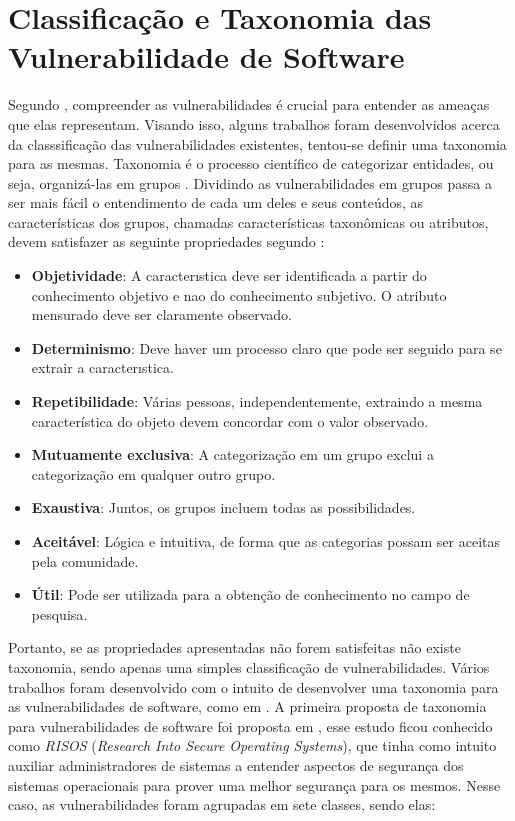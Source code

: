 \section{Classificação e Taxonomia das Vulnerabilidade de Software}\label{cwe}

Segundo , compreender as vulnerabilidades é
crucial para entender as ameaças que elas representam. Visando isso, alguns
trabalhos foram desenvolvidos acerca da classsificação das vulnerabilidades
existentes, tentou-se definir uma taxonomia para as mesmas. Taxonomia é o
processo científico de categorizar entidades, ou seja, organizá-las em grupos
\cite{gregio:2005}. Dividindo as vulnerabilidades em grupos passa a ser mais
fácil o entendimento de cada um deles e seus conteúdos, as características dos
grupos, chamadas características taxonômicas ou atributos, devem satisfazer as
seguinte propriedades segundo : 

\begin{itemize}
  \item \textbf{Objetividade}: A caracterıstica deve ser identificada a partir
    do conhecimento objetivo e nao do conhecimento subjetivo.  O atributo
    mensurado deve ser claramente observado.

  \item \textbf{Determinismo}: Deve haver um processo claro que pode ser seguido
    para se extrair a caracterıstica.

  \item \textbf{Repetibilidade}: Várias pessoas, independentemente, extraindo a
    mesma característica do objeto devem concordar com o valor observado.

  \item \textbf{Mutuamente exclusiva}: A categorização em um grupo exclui a
    categorização em qualquer outro grupo.

  \item \textbf{Exaustiva}: Juntos, os grupos incluem todas as possibilidades.

  \item \textbf{Aceitável}: Lógica e intuitiva, de forma que as categorias
    possam ser aceitas pela comunidade.

  \item \textbf{Útil}: Pode ser utilizada para a obtenção de conhecimento no
    campo de pesquisa.
\end{itemize}

Portanto, se as propriedades apresentadas não forem satisfeitas não existe
taxonomia, sendo apenas uma simples classificação de vulnerabilidades. Vários
trabalhos foram desenvolvido com o intuito de desenvolver uma taxonomia para as
vulnerabilidades de software, como em
. A primeira proposta de
taxonomia para vulnerabilidades de software foi proposta em
, esse estudo ficou conhecido como \textit{RISOS}
(\textit{Research Into Secure Operating Systems}), que tinha como intuito
auxiliar administradores de sistemas a entender aspectos de segurança dos
sistemas operacionais para prover uma melhor segurança para os mesmos. Nesse
caso, as vulnerabilidades foram agrupadas em sete classes, sendo elas:

